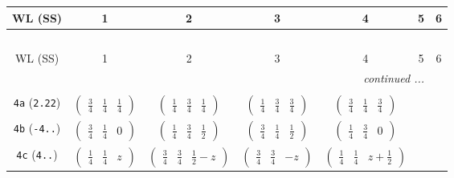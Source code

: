 \documentclass[fleqn,9pt,landscape]{jsarticle}
\begin{document}
\begin{center}
\renewcommand{\arraystretch}{1.2}
\begin{longtable}{ccccccc}
 \hline \hline
WL (SS) & 1 & 2 & 3 & 4 & 5 & 6 \\ \hline \endfirsthead

\multicolumn{6}{l}{\tablename\ \thetable{}} \\
 \hline \hline
WL (SS) & 1 & 2 & 3 & 4 & 5 & 6 \\ \hline \endhead

 \hline \hline
\multicolumn{6}{r}{\footnotesize\it continued ...} \\ \endfoot

 \hline \hline
\multicolumn{6}{r}{} \\ \endlastfoot

{\tt 4a} ({\tt 2.22}) & $ \begin{pmatrix} \frac{3}{4} & \frac{1}{4} & \frac{1}{4} \end{pmatrix} $ & $ \begin{pmatrix} \frac{1}{4} & \frac{3}{4} & \frac{1}{4} \end{pmatrix} $ & $ \begin{pmatrix} \frac{1}{4} & \frac{3}{4} & \frac{3}{4} \end{pmatrix} $ & $ \begin{pmatrix} \frac{3}{4} & \frac{1}{4} & \frac{3}{4} \end{pmatrix} $ & $  $ & $  $ \\ \hline
{\tt 4b} ({\tt -4..}) & $ \begin{pmatrix} \frac{3}{4} & \frac{1}{4} & 0 \end{pmatrix} $ & $ \begin{pmatrix} \frac{1}{4} & \frac{3}{4} & \frac{1}{2} \end{pmatrix} $ & $ \begin{pmatrix} \frac{3}{4} & \frac{1}{4} & \frac{1}{2} \end{pmatrix} $ & $ \begin{pmatrix} \frac{1}{4} & \frac{3}{4} & 0 \end{pmatrix} $ & $  $ & $  $ \\ \hline
{\tt 4c} ({\tt 4..}) & $ \begin{pmatrix} \frac{1}{4} & \frac{1}{4} & z \end{pmatrix} $ & $ \begin{pmatrix} \frac{3}{4} & \frac{3}{4} & \frac{1}{2} - z \end{pmatrix} $ & $ \begin{pmatrix} \frac{3}{4} & \frac{3}{4} & - z \end{pmatrix} $ & $ \begin{pmatrix} \frac{1}{4} & \frac{1}{4} & z + \frac{1}{2} \end{pmatrix} $ & $  $ & $  $ \\ \hline

\end{longtable}
\end{center}
\end{document}
